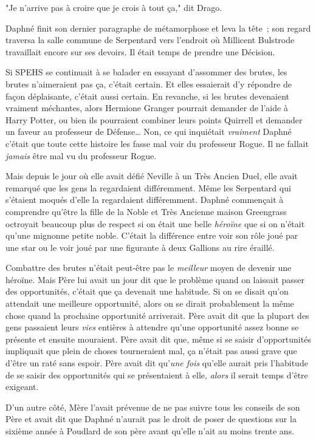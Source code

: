 "Je n'arrive pas à croire que je crois à tout ça," dit Drago.

\later

Daphné finit son dernier paragraphe de métamorphose et leva la tête~; son regard traversa la salle commune de Serpentard vers l'endroit où Millicent Bulstrode travaillait encore sur ses devoirs. Il était temps de prendre une Décision.

Si SPEHS se continuait à se balader en essayant d'assommer des brutes, les brutes n'aimeraient pas ça, c'était certain. Et elles essaierait d'y répondre de façon déplaisante, c'était aussi certain. En revanche, si les brutes devenaient vraiment méchantes, alors Hermione Granger pourrait demander de l'aide à Harry Potter, ou bien ils pourraient combiner leurs points Quirrell et demander un faveur au professeur de Défense… Non, ce qui inquiétait \emph{vraiment} Daphné c'était que toute cette histoire les fasse mal voir du professeur Rogue. Il ne fallait \emph{jamais} être mal vu du professeur Rogue.

Mais depuis le jour où elle avait défié Neville à un Très Ancien Duel, elle avait remarqué que les gens la regardaient différemment. Même les Serpentard qui s'étaient moqués d'elle la regardaient différemment. Daphné commençait à comprendre qu'être la fille de la Noble et Très Ancienne maison Greengrass octroyait beaucoup plus de respect si on était une belle \emph{héroïne} que si on n'était qu'une mignonne petite noble. C'était la différence entre voir son rôle joué par une star ou le voir joué par une figurante à deux Gallions au rire éraillé.

Combattre des brutes n'était peut-être pas le \emph{meilleur} moyen de devenir une héroïne. Mais Père lui avait un jour dit que le problème quand on laissait passer des opportunités, c'était que ça devenait une habitude. Si on se disait qu'on attendait une meilleure opportunité, alors on se dirait probablement la même chose quand la prochaine opportunité arriverait. Père avait dit que la plupart des gens passaient leurs \emph{vies} entières à attendre qu'une opportunité assez bonne se présente et ensuite mouraient. Père avait dit que, même si se saisir d'opportunités impliquait que plein de choses tourneraient mal, ça n'était pas aussi grave que d'être un raté sans espoir. Père avait dit qu'\emph{une fois} qu'elle aurait pris l'habitude de se saisir des opportunités qui se présentaient à elle, \emph{alors} il serait temps d'être exigeant.

D'un autre côté, Mère l'avait prévenue de ne pas suivre tous les conseils de son Père et avait dit que Daphné n'aurait pas le droit de poser de questions sur la sixième année à Poudlard de son père avant qu'elle n'ait au moins trente ans.

